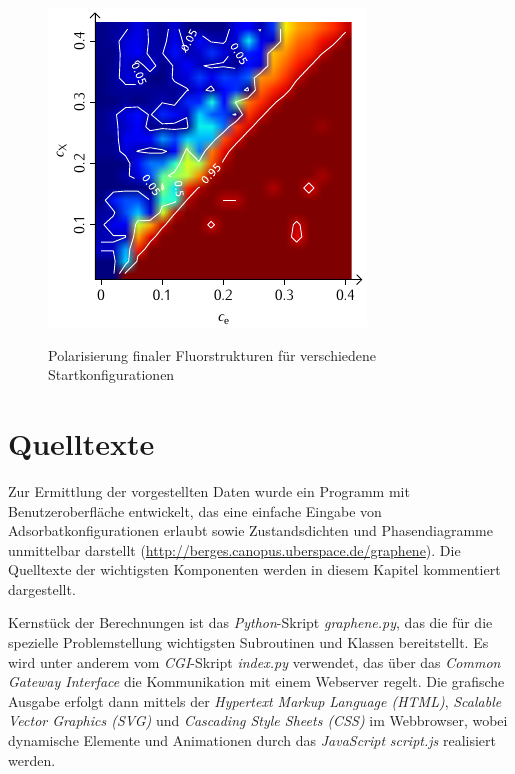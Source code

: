 \documentclass[a4paper, 10pt, twoside, openany]{book} %
\begin{document}
\begin{figure}
\begin{minipage}[t]{0.48\textwidth}
        \label{F_individual_P}
    \end{minipage}
    \hfill
    \begin{minipage}[t]{0.48\textwidth}
        \includegraphics[width=\textwidth]{Abbildungen/Phasendiagramme/Konturen/F_penalty_individual_P.pdf}
        \label{F_penalty_individual_P}
    \end{minipage}
    \caption[Polarisierung finaler Fluorstrukturen]{Polarisierung finaler Fluorstrukturen für verschiedene Startkonfigurationen}
    \label{F_P}
\end{figure}

\chapter{Quelltexte}

Zur Ermittlung der vorgestellten Daten wurde ein Programm mit Benutzeroberfläche entwickelt, das eine einfache Eingabe von Adsorbatkonfigurationen erlaubt sowie Zustandsdichten und Phasendiagramme unmittelbar darstellt (\url{http://berges.canopus.uberspace.de/graphene}). Die Quelltexte der wichtigsten Komponenten werden in diesem Kapitel kommentiert dargestellt.

Kernstück der Berechnungen ist das \emph{Python}-Skript \emph{graphene.py}, das die für die spezielle Problemstellung wichtigsten Subroutinen und Klassen bereitstellt. Es wird unter anderem vom \emph{CGI}-Skript \emph{index.py} verwendet, das über das \emph{Common Gateway Interface} die Kommunikation mit einem Webserver regelt. Die grafische Ausgabe erfolgt dann mittels der \emph{Hypertext Markup Language (HTML)}, \emph{Scalable Vector Graphics (SVG)} und \emph{Cascading Style Sheets (CSS)} im Webbrowser, wobei dynamische Elemente und Animationen durch das \emph{JavaScript} \emph{script.js} realisiert werden.
\end{document}
